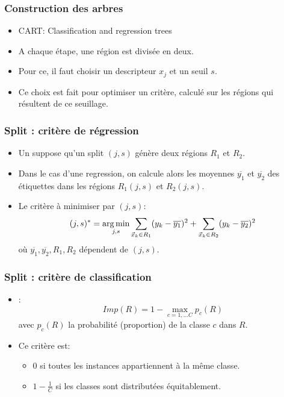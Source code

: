 \begin{frame}
  \frametitle{Construction des arbres}
  \begin{itemize}
    \item CART: Classification and regression trees
    \item A chaque étape, une région est divisée en deux. 
    \item Pour ce, il faut choisir un descripteur $x_j$ et un seuil $s$. 
    \item Ce choix est fait pour optimiser un critère, calculé sur les régions qui résultent de ce seuillage. 
  \end{itemize}
\end{frame}

\begin{frame}
  \frametitle{Split : critère de régression}
  \begin{itemize}
    \item Un suppose qu'un split $(j,s)$ génère deux régions $R_1$ et $R_2$. 
    \item Dans le cas d'une regression, on calcule alors les moyennes $\overline{y_1}$ et $\overline{y_2}$ des étiquettes dans les régions $R_1(j,s)$ et $R_2(j,s)$. 
    \item Le critère à minimiser par $(j,s)$:
    \begin{equation*}
    (j,s)^{\ast} = \operatorname*{arg\,min}_{j,s}\sum_{\vec{x}_k \in R_1} (y_k-\overline{y_1})^2 + \sum_{\vec{x}_k \in R_2}(y_k-\overline{y_2})^2
    \end{equation*}
    où $\overline{y_1}, \overline{y_2}, R_1, R_2$ dépendent de $(j,s)$. 
  \end{itemize}
\end{frame}

\begin{frame}
  \frametitle{Split : critère de classification}
  \begin{itemize}
    \item {} :  
    \begin{equation*}
    Imp(R) = 1- \max_{c=1, \ldots C}p_c(R)
    \end{equation*}
    avec $p_c(R)$ la probabilité (proportion) de la classe $c$ dans $R$. 
    \item Ce critère est:
    \begin{itemize}
      \item 0 si toutes les instances appartiennent à la même classe.
      \item $1-\frac{1}{C}$ si les classes sont distributées équitablement.
    \end{itemize}
  \end{itemize}
\end{frame}

